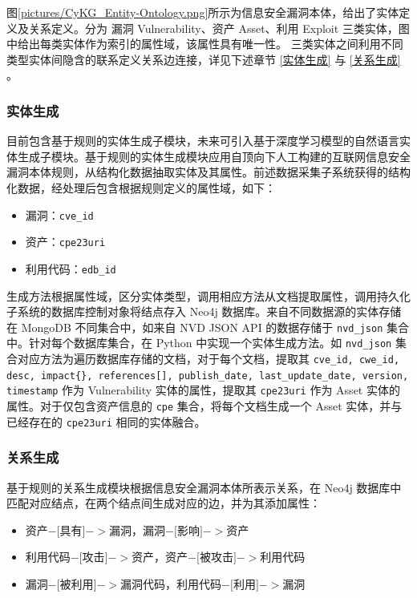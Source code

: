 \documentclass[a4paper,AutoFakeBold,oneside,12pt]{book}
\begin{document}
图\ref{pictures/CyKG_Entity-Ontology.png}所示为信息安全漏洞本体，给出了实体定义及关系定义。分为  漏洞 Vulnerability、资产 Asset、利用 Exploit 三类实体，图中给出每类实体作为索引的属性域，该属性具有唯一性。 三类实体之间利用不同类型实体间隐含的联系定义关系边连接，详见下述章节 \ref{实体生成} 与 \ref{关系生成} 。


\subsubsection{实体生成\label{实体生成}}

目前包含基于规则的实体生成子模块，未来可引入基于深度学习模型的自然语言实体生成子模块。基于规则的实体生成模块应用自顶向下人工构建的互联网信息安全漏洞本体规则，从结构化数据抽取实体及其属性。前述数据采集子系统获得的结构化数据，经处理后包含根据规则定义的属性域，如下：
\begin{itemize}
	\item 漏洞：\lstinline|cve_id|
	\item 资产：\lstinline|cpe23uri|
	\item 利用代码：\lstinline|edb_id|
\end{itemize}

生成方法根据属性域，区分实体类型，调用相应方法从文档提取属性，调用持久化子系统的数据库控制对象将结点存入 Neo4j 数据库。来自不同数据源的实体存储在 MongoDB 不同集合中，如来自 NVD JSON API 的数据存储于 \lstinline|nvd_json| 集合中。针对每个数据库集合，在 Python 中实现一个实体生成方法。如 \lstinline|nvd_json| 集合对应方法为遍历数据库存储的文档，对于每个文档，提取其 \lstinline|cve_id, cwe_id, desc, impact{}, references[], publish_date, last_update_date, version, timestamp| 作为 Vulnerability 实体的属性，提取其 \lstinline|cpe23uri| 作为 Asset 实体的属性。对于仅包含资产信息的 \lstinline|cpe| 集合，将每个文档生成一个 Asset 实体，并与已经存在的 \lstinline|cpe23uri| 相同的实体融合。

\subsubsection{关系生成\label{关系生成}}

基于规则的关系生成模块根据信息安全漏洞本体所表示关系，在 Neo4j 数据库中匹配对应结点，在两个结点间生成对应的边，并为其添加属性：
\begin{itemize}
	\item 资产$-[$具有$]->$漏洞，漏洞$-[$影响$]->$资产
	\item 利用代码$-[$攻击$]->$资产，资产$-[$被攻击$]->$利用代码
	\item 漏洞$-[$被利用$]->$漏洞代码，利用代码$-[$利用$]->$漏洞
\end{itemize}
\end{document}
